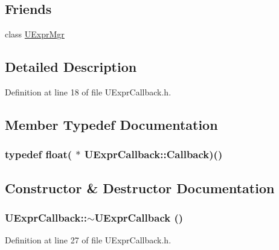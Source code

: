 \subsection*{Friends}
\begin{CompactItemize}
\item 
class \hyperlink{class_u_expr_callback_aba1a84b84f2ff7cab4b76539215bd34}{UExprMgr}
\end{CompactItemize}


\subsection{Detailed Description}


Definition at line 18 of file UExprCallback.h.

\subsection{Member Typedef Documentation}
\hypertarget{class_u_expr_callback_d059184ad045fcaaa0022a4b4b4088b2}{
\subsubsection[{Callback}]{\setlength{\rightskip}{0pt plus 5cm}typedef float( $\ast$ {\bf UExprCallback::Callback})()}}
\label{class_u_expr_callback_d059184ad045fcaaa0022a4b4b4088b2}




\subsection{Constructor \& Destructor Documentation}
\hypertarget{class_u_expr_callback_4ef7a1d337f8c5a924658dcfb1baf81f}{
\subsubsection[{$\sim$UExprCallback}]{\setlength{\rightskip}{0pt plus 5cm}UExprCallback::$\sim$UExprCallback ()}}
\label{class_u_expr_callback_4ef7a1d337f8c5a924658dcfb1baf81f}




Definition at line 27 of file UExprCallback.h.

